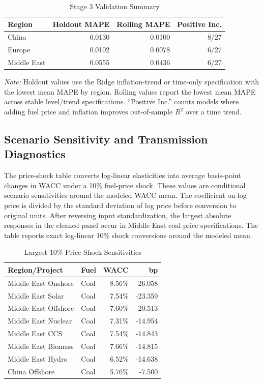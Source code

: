 \begin{table}[!ht]
\centering
\caption{Stage 3 Validation Summary}
\label{tab:appendix-validation}
\scriptsize
\begin{tabular}{lrrr}
\toprule
\textbf{Region} & \textbf{Holdout MAPE} & \textbf{Rolling MAPE} & \textbf{Positive Inc.} \\
\midrule
China & 0.0130 & 0.0100 & 8/27 \\
Europe & 0.0102 & 0.0078 & 6/27 \\
Middle East & 0.0555 & 0.0436 & 6/27 \\
\bottomrule
\end{tabular}
\vspace{2pt}

\raggedright\scriptsize
\textit{Note:} Holdout values use the Ridge inflation-trend or time-only specification with the lowest mean MAPE by region. Rolling values report the lowest mean MAPE across stable level/trend specifications. ``Positive Inc.'' counts models where adding fuel price and inflation improves out-of-sample $R^2$ over a time trend.
\end{table}

\subsection{Scenario Sensitivity and Transmission Diagnostics}

The price-shock table converts log-linear elasticities into average basis-point changes in WACC under a 10\% fuel-price shock. These values are conditional scenario sensitivities around the modeled WACC mean. The coefficient on log price is divided by the standard deviation of log price before conversion to original units. After reversing input standardization, the largest absolute responses in the cleaned panel occur in Middle East coal-price specifications. The table reports exact log-linear 10\% shock conversions around the modeled mean.

\begin{table}[!ht]
\centering
\caption{Largest 10\% Price-Shock Sensitivities}
\label{tab:appendix-elasticities}
\scriptsize
\begin{tabular}{llrr}
\toprule
\textbf{Region/Project} & \textbf{Fuel} & \textbf{WACC} & \textbf{bp} \\
\midrule
Middle East Onshore & Coal & 8.56\% & -26.058 \\
Middle East Solar & Coal & 7.54\% & -23.359 \\
Middle East Offshore & Coal & 7.60\% & -20.513 \\
Middle East Nuclear & Coal & 7.31\% & -14.954 \\
Middle East CCS & Coal & 7.54\% & -14.843 \\
Middle East Biomass & Coal & 7.66\% & -14.815 \\
Middle East Hydro & Coal & 6.52\% & -14.638 \\
China Offshore & Coal & 5.76\% & -7.500 \\
\bottomrule
\end{tabular}
\end{table}


